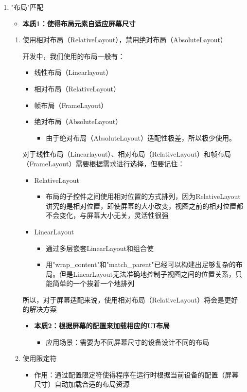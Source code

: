 \documentclass[9pt, b5paper]{article}
\begin{document}
\begin{enumerate}
\item "布局"匹配
\label{sec-6-6-1-1}
\begin{itemize}
\item \textbf{本质1：使得布局元素自适应屏幕尺寸}
\end{itemize}
\begin{enumerate}
\item 使用相对布局（RelativeLayout），禁用绝对布局（AbsoluteLayout）
\label{sec-6-6-1-1-1}

开发中，我们使用的布局一般有：
\begin{itemize}
\item 线性布局（Linearlayout）
\item 相对布局（RelativeLayout）
\item 帧布局（FrameLayout）
\item 绝对布局（AbsoluteLayout）
\begin{itemize}
\item 由于绝对布局（AbsoluteLayout）适配性极差，所以极少使用。
\end{itemize}
\end{itemize}

对于线性布局（Linearlayout）、相对布局（RelativeLayout）和帧布局（FrameLayout）需要根据需求进行选择，但要记住：
\begin{itemize}
\item RelativeLayout
\begin{itemize}
\item 布局的子控件之间使用相对位置的方式排列，因为RelativeLayout讲究的是相对位置，即使屏幕的大小改变，视图之前的相对位置都不会变化，与屏幕大小无关，灵活性很强
\end{itemize}
\item LinearLayout
\begin{itemize}
\item 通过多层嵌套LinearLayout和组合使
\item 用"wrap\_content"和"match\_parent"已经可以构建出足够复杂的布局。但是LinearLayout无法准确地控制子视图之间的位置关系，只能简单的一个挨着一个地排列
\end{itemize}
\end{itemize}

所以，对于屏幕适配来说，使用相对布局（RelativeLayout）将会是更好的解决方案

\begin{itemize}
\item \textbf{本质2：根据屏幕的配置来加载相应的UI布局}
\begin{itemize}
\item 应用场景：需要为不同屏幕尺寸的设备设计不同的布局
\end{itemize}
\end{itemize}
\item 使用限定符
\label{sec-6-6-1-1-2}
\begin{itemize}
\item 作用：通过配置限定符使得程序在运行时根据当前设备的配置（屏幕尺寸）自动加载合适的布局资源
\end{itemize}


\end{enumerate}
\end{enumerate}
\end{document}

